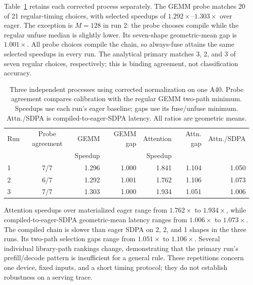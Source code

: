 \documentclass[a4paper,fleqn]{cas-dc}
\begin{document}
Table~\ref{tab:replication} retains each corrected process separately.
The GEMM probe matches 20 of 21 regular-timing choices, with selected speedups of $1.292\times$--$1.303\times$ over eager.
The exception is $M{=}128$ in run 2: the probe chooses compile while the regular unfuse median is slightly lower.
Its seven-shape geometric-mean gap is $1.001\times$.
All probe choices compile the chain, so always-fuse attains the same selected speedups in every run.
The analytical primary matches 3, 2, and 3 of seven regular choices, respectively; this is binding agreement, not classification accuracy.


\begin{table}[t]
  \centering
  \caption{Three independent processes using corrected normalization on one A40. Probe agreement compares calibration with the regular GEMM two-path minimum. Speedups use each run's eager baseline; gaps use its fuse/unfuse minimum. Attn./SDPA is compiled-to-eager-SDPA latency. All ratios are geometric means.}
  \label{tab:replication}
  \small
  \setlength{\tabcolsep}{4pt}
  \begin{tabular}{@{}lcrrrrr@{}}
    \toprule
    Run & Probe agreement & GEMM & GEMM gap & Attention & Attn. gap & Attn./SDPA \\
        &                 & Speedup &        & Speedup &           & \\
    \midrule
    1 & 7/7 & 1.296 & 1.000 & 1.841 & 1.104 & 1.050 \\
    2 & 6/7 & 1.292 & 1.001 & 1.762 & 1.106 & 1.073 \\
    3 & 7/7 & 1.303 & 1.000 & 1.934 & 1.051 & 1.006 \\
    \bottomrule
  \end{tabular}
\end{table}

Attention speedups over materialized eager range from $1.762\times$ to $1.934\times$, while compiled-to-eager-SDPA geometric-mean latency ranges from $1.006\times$ to $1.073\times$.
The compiled chain is slower than eager SDPA on 2, 2, and 1 shapes in the three runs.
Its two-path selection gaps range from $1.051\times$ to $1.106\times$.
Several individual library-path rankings change, demonstrating that the primary run's prefill/decode pattern is insufficient for a general rule.
These repetitions concern one device, fixed inputs, and a short timing protocol; they do not establish robustness on a serving trace.


\clearpage


\end{document}
